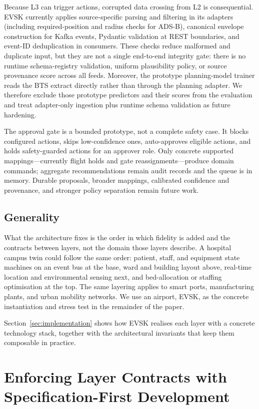 \documentclass[runningheads]{llncs}
\begin{document}
Because L3 can trigger actions, corrupted data crossing from L2 is consequential. EVSK currently applies source-specific parsing and filtering in its adapters (including required-position and radius checks for ADS-B), canonical envelope construction for Kafka events, Pydantic validation at REST boundaries, and event-ID deduplication in consumers. These checks reduce malformed and duplicate input, but they are not a single end-to-end integrity gate: there is no runtime schema-registry validation, uniform plausibility policy, or source provenance score across all feeds. Moreover, the prototype planning-model trainer reads the BTS extract directly rather than through the planning adapter. We therefore exclude those prototype predictors and their scores from the evaluation and treat adapter-only ingestion plus runtime schema validation as future hardening.

The approval gate is a bounded prototype, not a complete safety case. It blocks configured actions, skips low-confidence ones, auto-approves eligible actions, and holds safety-guarded actions for an approver role. Only concrete supported mappings---currently flight holds and gate reassignments---produce domain commands; aggregate recommendations remain audit records and the queue is in memory. Durable proposals, broader mappings, calibrated confidence and provenance, and stronger policy separation remain future work.

\subsection{Generality}

What the architecture fixes is the order in which fidelity is added and the contracts between layers, not the domain those layers describe. A hospital campus twin could follow the same order: patient, staff, and equipment state machines on an event bus at the base, ward and building layout above, real-time location and environmental sensing next, and bed-allocation or staffing optimisation at the top. The same layering applies to smart ports, manufacturing plants, and urban mobility networks. We use an airport, EVSK, as the concrete instantiation and stress test in the remainder of the paper.

Section~\ref{sec:implementation} shows how EVSK realises each layer with a concrete technology stack, together with the architectural invariants that keep them composable in practice.

\section{Enforcing Layer Contracts with Specification-First Development}\label{sec:methodology}
\end{document}
